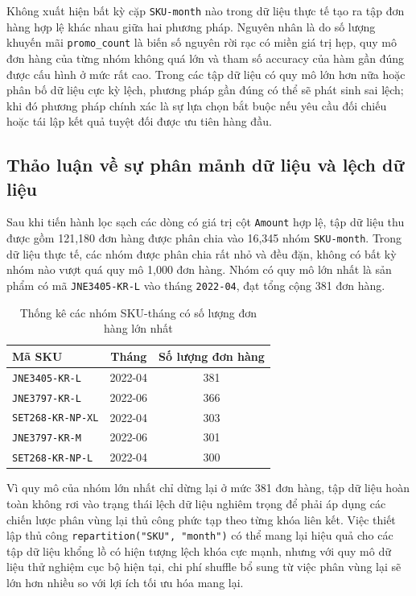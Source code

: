 Không xuất hiện bất kỳ cặp \texttt{SKU-month} nào trong dữ liệu thực tế tạo ra tập đơn hàng hợp lệ khác nhau giữa hai phương pháp. Nguyên nhân là do số lượng khuyến mãi \texttt{promo\_count} là biến số nguyên rời rạc có miền giá trị hẹp, quy mô đơn hàng của từng nhóm không quá lớn và tham số accuracy của hàm gần đúng được cấu hình ở mức rất cao. Trong các tập dữ liệu có quy mô lớn hơn nữa hoặc phân bố dữ liệu cực kỳ lệch, phương pháp gần đúng có thể sẽ phát sinh sai lệch; khi đó phương pháp chính xác là sự lựa chọn bắt buộc nếu yêu cầu đối chiếu hoặc tái lập kết quả tuyệt đối được ưu tiên hàng đầu.

\subsection{Thảo luận về sự phân mảnh dữ liệu và lệch dữ liệu}

Sau khi tiến hành lọc sạch các dòng có giá trị cột \texttt{Amount} hợp lệ, tập dữ liệu thu được gồm 121,180 đơn hàng được phân chia vào 16,345 nhóm \texttt{SKU-month}. Trong dữ liệu thực tế, các nhóm được phân chia rất nhỏ và đều đặn, không có bất kỳ nhóm nào vượt quá quy mô 1,000 đơn hàng. Nhóm có quy mô lớn nhất là sản phẩm có mã \texttt{JNE3405-KR-L} vào tháng \texttt{2022-04}, đạt tổng cộng 381 đơn hàng.

\begin{table}[H]
\centering
\begin{tabular}{lcc}
\toprule
\textbf{Mã SKU} & \textbf{Tháng} & \textbf{Số lượng đơn hàng} \\
\midrule
\texttt{JNE3405-KR-L} & 2022-04 & 381 \\
\texttt{JNE3797-KR-L} & 2022-06 & 366 \\
\texttt{SET268-KR-NP-XL} & 2022-04 & 303 \\
\texttt{JNE3797-KR-M} & 2022-06 & 301 \\
\texttt{SET268-KR-NP-L} & 2022-04 & 300 \\
\bottomrule
\end{tabular}
\caption{Thống kê các nhóm SKU-tháng có số lượng đơn hàng lớn nhất}
\label{tab:task2_2_top_skewed_groups}
\end{table}

Vì quy mô của nhóm lớn nhất chỉ dừng lại ở mức 381 đơn hàng, tập dữ liệu hoàn toàn không rơi vào trạng thái lệch dữ liệu nghiêm trọng để phải áp dụng các chiến lược phân vùng lại thủ công phức tạp theo từng khóa liên kết. Việc thiết lập thủ công \texttt{repartition("SKU", "month")} có thể mang lại hiệu quả cho các tập dữ liệu khổng lồ có hiện tượng lệch khóa cực mạnh, nhưng với quy mô dữ liệu thử nghiệm cục bộ hiện tại, chi phí shuffle bổ sung từ việc phân vùng lại sẽ lớn hơn nhiều so với lợi ích tối ưu hóa mang lại.

